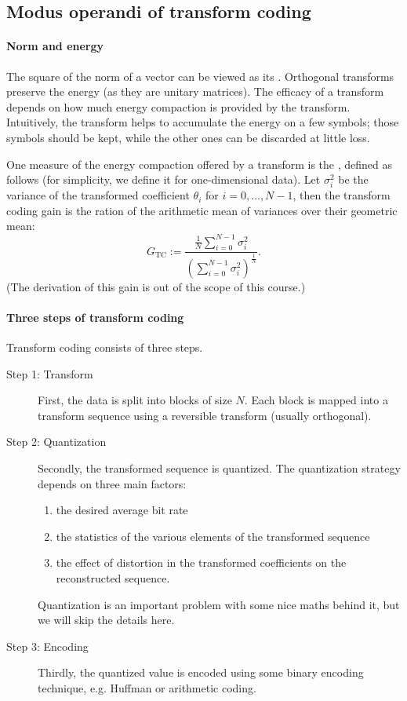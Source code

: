 \documentclass[a4paper, 11pt, openany]{book}
\begin{document}
\subsection{Modus operandi of transform coding}


\paragraph{Norm and energy}
The square of the norm of a vector can be viewed as its . Orthogonal transforms preserve the energy (as they are unitary matrices). The efficacy of a transform depends on how much energy compaction is provided by the transform. Intuitively, the transform helps to accumulate the energy on a few symbols; those symbols should be kept, while the other ones can be discarded at little loss.

One measure of the energy compaction offered by a transform is the , defined as follows (for simplicity, we define it for one-dimensional data). Let $\sigma_i^2$ be the variance of the transformed coefficient $\theta_i$ for $i=0, \dots, N-1$, then the transform coding gain is the ration of the arithmetic mean of variances over their geometric mean:
\[
    G_{\mathrm{TC}} := \frac{ \frac{1}{N} \sum_{i=0}^{N-1} \sigma_i^2 }{ \left(\sum_{i=0}^{N-1} \sigma_i^2 \right)^{\frac{1}{N}} }.
\]
(The derivation of this gain is out of the scope of this course.)


\paragraph{Three steps of transform coding}
Transform coding consists of three steps.
\begin{description}
\item[Step 1: Transform] First, the data is split into blocks of size $N$. Each block is mapped into a transform sequence using a reversible transform (usually orthogonal).

\item[Step 2: Quantization] Secondly, the transformed sequence is quantized. The quantization strategy depends on three main factors:
\begin{enumerate}
    \item the desired average bit rate

    \item the statistics of the various elements of the transformed sequence

    \item the effect of distortion in the transformed coefficients on the reconstructed sequence.
\end{enumerate}
Quantization is an important problem with some nice maths behind it, but we will skip the details here.

\item[Step 3: Encoding] Thirdly, the quantized value is encoded using some binary encoding technique, e.g. Huffman or arithmetic coding.
\end{description}
\end{document}
